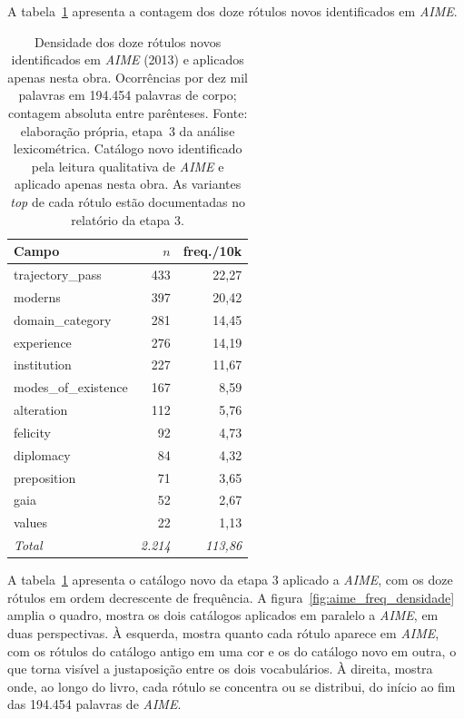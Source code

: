 A tabela~\ref{tab:aime_catalogo_novo} apresenta a contagem dos doze rótulos novos identificados em \textit{AIME}.

\begin{table}[!htb]
\centering
\caption[Doze rótulos novos identificados em AIME 2013]{Densidade dos doze rótulos novos identificados em \textit{AIME} (2013) e aplicados apenas nesta obra. Ocorrências por dez mil palavras em 194.454 palavras de corpo; contagem absoluta entre parênteses. Fonte: elaboração própria, etapa~3 da análise lexicométrica. Catálogo novo identificado pela leitura qualitativa de \textit{AIME} e aplicado apenas nesta obra. As variantes \emph{top} de cada rótulo estão documentadas no relatório da etapa  3.}
\label{tab:aime_catalogo_novo}
\small
\begin{tabular}{lrr}
\toprule
Campo & $n$ & freq./10k \\
\midrule
trajectory\_pass    & 433 & 22{,}27 \\
moderns             & 397 & 20{,}42 \\
domain\_category    & 281 & 14{,}45 \\
experience          & 276 & 14{,}19 \\
institution         & 227 & 11{,}67 \\
modes\_of\_existence & 167 &  8{,}59 \\
alteration          & 112 &  5{,}76 \\
felicity            &  92 &  4{,}73 \\
diplomacy           &  84 &  4{,}32 \\
preposition         &  71 &  3{,}65 \\
gaia                &  52 &  2{,}67 \\
values              &  22 &  1{,}13 \\
\midrule
\textit{Total}      & \textit{2.214} & \textit{113{,}86} \\
\bottomrule
\end{tabular}
\end{table}

A tabela~\ref{tab:aime_catalogo_novo} apresenta o catálogo novo da etapa 3 aplicado a \textit{AIME}, com os doze rótulos em ordem decrescente de frequência. A figura~\ref{fig:aime_freq_densidade} amplia o quadro, mostra os dois catálogos aplicados em paralelo a \textit{AIME}, em duas perspectivas. À esquerda, mostra quanto cada rótulo aparece em \textit{AIME}, com os rótulos do catálogo antigo em uma cor e os do catálogo novo em outra, o que torna visível a justaposição entre os dois vocabulários. À direita, mostra onde, ao longo do livro, cada rótulo se concentra ou se distribui, do início ao fim das 194.454 palavras de \textit{AIME}.

